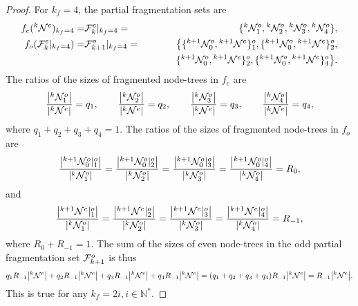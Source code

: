 \begin{proof}
  For $k_f = 4$, the partial fragmentation sets are
  \begin{eqnarray*}
    f_e({}^{k}\mathcal{N}^e)_{k_f = 4} 
    =& \mathcal{F}^e_{k}|_{k_f = 4} 
    =&\{ {}^{k}\mathcal{N}^{o}_1, {}^{k}\mathcal{N}^{o}_2,  {}^{k}\mathcal{N}^{o}_3, {}^{k}\mathcal{N}^{o}_4\},  \\
    f_o(\mathcal{F}^e_{k}|_{k_f = 4}) 
    =& \mathcal{F}^o_{k+1} |_{k_f = 4} 
    =& \big\{      \{ {}^{k+1}\mathcal{N}^{o}_0, {}^{k+1}\mathcal{N}^e\}^o_1, 
                    \{ {}^{k+1}\mathcal{N}^{o}_0, {}^{k+1}\mathcal{N}^e\}^o_2, \\
    && \hspace{3em} \{ {}^{k+1}\mathcal{N}^{o}_0, {}^{k+1}\mathcal{N}^e\}^o_2,
                    \{ {}^{k+1}\mathcal{N}^{o}_0, {}^{k+1}\mathcal{N}^e\}^o_4 \big\}.
  \end{eqnarray*}
  The ratios of the sizes of fragmented node-trees in $f_e$ are
  \begin{equation*}
    \frac{\abs{{}^{k} \mathcal{N}^{o}_1}}{\abs{{}^{k}\mathcal{N}^e}} = q_1, \hspace{2em}
    \frac{\abs{{}^{k} \mathcal{N}^{o}_2}}{\abs{{}^{k}\mathcal{N}^e}} = q_2, \hspace{2em}
    \frac{\abs{{}^{k} \mathcal{N}^{o}_3}}{\abs{{}^{k}\mathcal{N}^e}} = q_3, \hspace{2em}
    \frac{\abs{{}^{k} \mathcal{N}^{o}_4}}{\abs{{}^{k}\mathcal{N}^e}} = q_4, 
  \end{equation*}
  where $ q_1 + q_2 + q_3 + q_4 = 1$. The ratios of the sizes of fragmented node-trees in $f_o$ are
  \begin{equation*}
    \frac{\abs{{}^{k+1}\mathcal{N}^o_0|^o_1}}{\abs{{}^{k} \mathcal{N}^{o}_1}} = 
    \frac{\abs{{}^{k+1}\mathcal{N}^o_0|^o_2}}{\abs{{}^{k} \mathcal{N}^{o}_2}} = 
    \frac{\abs{{}^{k+1}\mathcal{N}^o_0|^o_3}}{\abs{{}^{k} \mathcal{N}^{o}_3}} = 
    \frac{\abs{{}^{k+1}\mathcal{N}^o_0|^o_4}}{\abs{{}^{k} \mathcal{N}^{o}_4}} = R_0,
  \end{equation*}
  and 
  \begin{equation*}
    \frac{\abs{{}^{k+1}\mathcal{N}^e|^o_1}}{\abs{{}^{k} \mathcal{N}^{o}_1}} = 
    \frac{\abs{{}^{k+1}\mathcal{N}^e|^o_2}}{\abs{{}^{k} \mathcal{N}^{o}_2}} = 
    \frac{\abs{{}^{k+1}\mathcal{N}^e|^o_3}}{\abs{{}^{k} \mathcal{N}^{o}_3}} = 
    \frac{\abs{{}^{k+1}\mathcal{N}^e|^o_4}}{\abs{{}^{k} \mathcal{N}^{o}_4}} = R_{-1},  
  \end{equation*}
  where $R_0 + R_{-1} = 1$. The sum of the sizes of even node-trees in  the odd partial fragmentation set $\mathcal{F}^o_{k+1}$ is thus
  \begin{equation*}
    q_1 R_{-1} \abs{{}^{k}\mathcal{N}^e} + q_2 R_{-1} \abs{{}^{k}\mathcal{N}^e} + q_3 R_{-1} \abs{{}^{k}\mathcal{N}^e} + q_4 R_{-1} \abs{{}^{k}\mathcal{N}^e} = (q_1 + q_2 + q_3 + q_4 ) R_{-1} \abs{{}^{k}\mathcal{N}^e} = R_{-1} \abs{{}^{k}\mathcal{N}^e}. 
  \end{equation*}
  This is true for any $k_f = 2i, i\in \mathbb{N}^*$. 
\end{proof}

